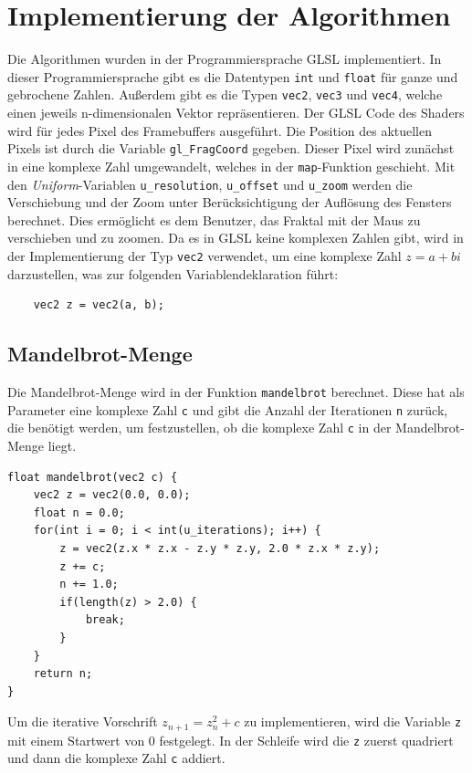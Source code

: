 \section{Implementierung der Algorithmen}
Die Algorithmen wurden in der Programmiersprache GLSL implementiert. In dieser
Programmiersprache gibt es die Datentypen \texttt{int} und \texttt{float} für
ganze und gebrochene Zahlen. Außerdem gibt es die Typen \texttt{vec2},
\texttt{vec3} und \texttt{vec4}, welche einen jeweils n-dimensionalen Vektor
repräsentieren. \newline Der GLSL Code des Shaders wird für jedes Pixel des
Framebuffers ausgeführt. Die Position des aktuellen Pixels ist durch die
Variable \texttt{gl\_FragCoord} gegeben. \newline Dieser Pixel wird zunächst in
eine komplexe Zahl umgewandelt, welches in der \texttt{map}-Funktion geschieht.
Mit den \textit{Uniform}-Variablen \texttt{u\_resolution}, \texttt{u\_offset}
und \texttt{u\_zoom} werden die Verschiebung und der Zoom unter
Berücksichtigung der Auflösung des Fensters berechnet. Dies ermöglicht es dem
Benutzer, das Fraktal mit der Maus zu verschieben und zu zoomen. \newline
\hfill \break \noindent Da es in GLSL keine komplexen Zahlen gibt, wird in der
Implementierung der Typ \texttt{vec2} verwendet, um eine komplexe Zahl $z=a+bi$
darzustellen, was zur folgenden Variablendeklaration führt:
\begin{verbatim}
    vec2 z = vec2(a, b);
\end{verbatim}

\subsection{Mandelbrot-Menge}
Die Mandelbrot-Menge wird in der Funktion \texttt{mandelbrot} berechnet. Diese
hat als Parameter eine komplexe Zahl \texttt{c} und gibt die Anzahl der
Iterationen \texttt{n} zurück, die benötigt werden, um festzustellen, ob die
komplexe Zahl \texttt{c} in der Mandelbrot-Menge liegt.
\begin{verbatim}
float mandelbrot(vec2 c) {
    vec2 z = vec2(0.0, 0.0);
    float n = 0.0;
    for(int i = 0; i < int(u_iterations); i++) {
        z = vec2(z.x * z.x - z.y * z.y, 2.0 * z.x * z.y);
        z += c;
        n += 1.0;
        if(length(z) > 2.0) {
            break;
        }
    }
    return n;
}
\end{verbatim}

\noindent
Um die iterative Vorschrift $z_{n+1} = z_n^2 + c$ zu implementieren, wird die
Variable \texttt{z} mit einem Startwert von 0 festgelegt. In der Schleife wird
die \texttt{z} zuerst quadriert und dann die komplexe Zahl \texttt{c} addiert.

